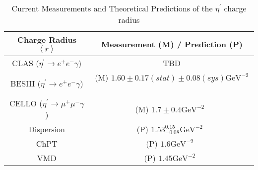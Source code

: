 \begin{table}[h!]
\centering
\caption{\label{tab:etaP.models}Current Measurements and Theoretical Predictions of the $\eta^{\prime}$ charge radius \vspace{0.75mm}}

\begin{tabular}{cc}
\hline
Charge Radius $\left< r\right>$ & Measurement (M) / Prediction (P) \\
\hline
CLAS ($\eta^{\prime}\to e^+e^-\gamma$)   & TBD \\
BESIII ($\eta^{\prime}\to e^+e^-\gamma$)   & (M) $1.60\pm0.17(stat)\pm0.08(sys) \mathrm{GeV}^{-2}$~\cite{bib7} \\
CELLO ($\eta^{\prime}\to \mu^+\mu^-\gamma$)   & (M)  $1.7\pm0.4 \mathrm{GeV}^{-2}$~\cite{bib9}  \\
\hline
Dispersion    & (P)  $1.53^{0.15}_{-0.08} \mathrm{GeV}^{-2}$~\cite{bib12}  \\
ChPT    & (P) $1.6 \mathrm{GeV}^{-2}$~\cite{bib11}  \\
VMD    & (P) $1.45  \mathrm{GeV}^{-2}$~\cite{bib10}  \\
\hline 
\end{tabular}
\end{table}
